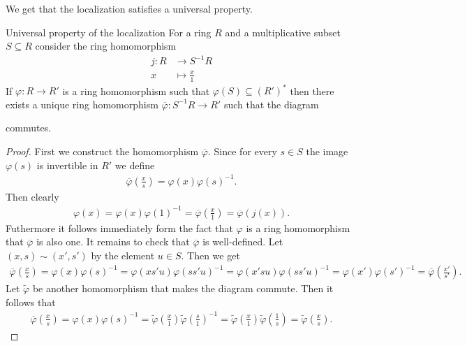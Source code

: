 \documentclass[../notes.tex]{subfiles}
\begin{document}
\smallskip
\noindent
We get that the localization satisfies a universal property.

\smallskip
\begin{lemm}{Universal property of the localization}{}
  For a ring $R$ and a multiplicative subset $S \subseteq R$ consider the ring homomorphism
  \begin{align*}
    j: R & \longrightarrow S^{-1}R \\
    x & \longmapsto \frac{x}{1}
  \end{align*}
  If $\varphi : R \to R'$ is a ring homomorphism such that $\varphi(S) \subseteq (R')^*$
  then there exists a unique ring homomorphism $\overline{\varphi}: S^{-1}R \to R'$
  such that the diagram
  \begin{center}
  \end{center}
  commutes.
\end{lemm}

\begin{proof}
  First we construct the homomorphism $\overline{\varphi}$. Since for every
  $s \in S$ the image $\varphi(s)$ is invertible in $R'$ we define
  \begin{align*}
    \overline{\varphi} \left(\frac{x}{s} \right) = \varphi(x) \varphi(s)^{-1}.
  \end{align*}
  Then clearly
  \begin{align*}
    \varphi(x) = \varphi(x) \varphi(1)^{-1} = \overline{\varphi} \left(\frac{x}{1} \right)
    = \overline{\varphi}(j(x)).
  \end{align*}
  Futhermore it follows immediately form the fact that $\varphi$ is a ring homomorphism
  that $\overline\varphi$ is also one. It remains to check that $\overline\varphi$ is
  well-defined. Let $(x,s) \sim (x',s')$ by the element $u \in S$. Then we get
  \begin{align*}
    \overline{\varphi} \left(\frac{x}{s} \right) = \varphi(x) \varphi(s)^{-1}
    = \varphi(xs'u) \varphi(ss'u)^{-1} = \varphi(x'su) \varphi(ss'u)^{-1} = \varphi(x')
    \varphi(s')^{-1} = \overline{\varphi} \left(\frac{x'}{s'} \right).
  \end{align*}
  Let $\tilde\varphi$ be another homomorphism that makes the diagram commute.
  Then it follows that
  \begin{align*}
    \overline{\varphi} \left(\frac{x}{s} \right) = \varphi(x) \varphi(s)^{-1}
    = \tilde{\varphi} \left(\frac{x}{1} \right) \tilde{\varphi} \left(\frac{s}{1} \right)^{-1}
    = \tilde{\varphi} \left(\frac{x}{1} \right) \tilde{\varphi} \left(\frac{1}{s} \right)
    = \tilde{\varphi} \left(\frac{x}{s} \right).
  \end{align*}
\end{proof}
\end{document}
